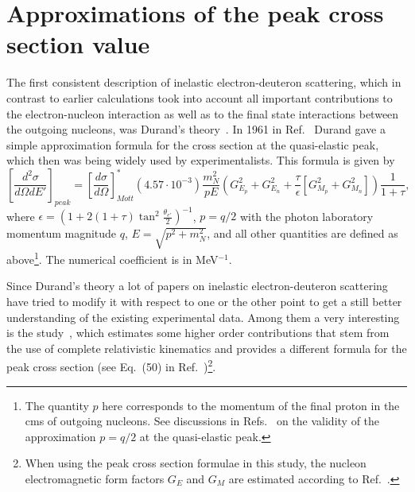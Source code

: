 \newpage
\chapter{Approximations of the peak cross section value}
\mbox{}\vspace{-\baselineskip}

The first consistent description of inelastic electron-deuteron scattering, which in contrast to earlier calculations took into account all important contributions to the electron-nucleon interaction as well as to the final state interactions between the outgoing nucleons, was Durand's theory~\cite{Durand:1959zz,Durand:1961zz}. In 1961 in Ref.~\cite{Durand:1961zz} Durand gave a simple approximation formula for the cross section at the quasi-elastic peak, which then was being widely used by experimentalists. This formula is given by
\begin{equation}
\left [ \frac{d^{2}\sigma}{d\Omega dE'} \right ]_{peak} = \left [ \frac{d\sigma}{d\Omega} \right ]_{Mott}^{*} ( 4.57\cdot 10^{-3}) \frac{m_{N}^{2}}{pE} \left (G_{E_{p}}^{2} + G_{E_{n}}^{2} + \frac{\tau}{\epsilon}\left [G_{M_{p}}^{2} + G_{M_{n}}^{2}\right ]  \right )\frac{1}{1+\tau},\label{eq:durand}
\end{equation}
where $\epsilon = \left (1 +2(1+\tau)\tan^{2}\frac{\theta_{e'}}{2} \right )^{-1}$, $p = q/2$ with the photon laboratory momentum magnitude $q$, $E=\sqrt{p^{2} + m_{N}^{2}}$, and all other quantities are defined as above\footnote[3]{The quantity $p$ here corresponds to the momentum of the final proton in the cms of outgoing nucleons. See discussions in Refs.~\cite{Durand:1959zz,Durand:1961zz,Budnitz:1969dt} on the validity of the approximation $p = q/2$ at the quasi-elastic peak.}. The numerical coefficient is in MeV$^{-1}$.


Since Durand's theory a lot of papers on inelastic electron-deuteron scattering~\cite{Kocevar:1967,Budnitz:1969dt,Hanson:1973vf} have tried to modify it with respect to one or the other point to get a still better understanding of the existing experimental data. Among them a very interesting is the study~\cite{Kocevar:1967}, which estimates some higher order contributions that stem from the use of complete relativistic kinematics and provides a different formula for the peak cross section (see Eq.~(50) in Ref.~\cite{Kocevar:1967})\footnote[4]{When using the peak cross section formulae in this study, the nucleon electromagnetic form factors $G_{E}$ and $G_{M}$ are estimated according to Ref.~\cite{Bosted:1994tm}.}.



